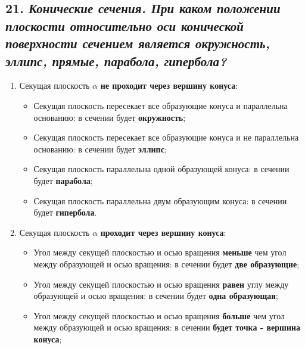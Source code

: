 \newpage
\subsection*{21. \textit{Конические сечения. При каком положении плоскости относительно оси конической поверхности сечением является окружность, эллипс, прямые, парабола, гипербола?}}

\begin{mainQuote}
\end{mainQuote}

\begin{enumerate}
    \item Секущая плоскость $\alpha$ {\bf не проходит через вершину конуса}:
    \begin{itemize}
        \item Секущая плоскость пересекает все образующие конуса и параллельна основанию: в сечении будет {\bf окружность};
        \item Секущая плоскость пересекает все образующие конуса и не параллельна основанию: в сечении будет {\bf эллипс};
        \item Секущая плоскость параллельна одной образующей конуса: в сечении будет {\bf парабола};
        \item Секущая плоскость параллельна двум образующим конуса: в сечении будет {\bf гипербола}.
    \end{itemize}
    \item Секущая плоскость $\alpha$ {\bf проходит через вершину конуса}:
    \begin{itemize}
        \item Угол между секущей плоскостью и осью вращения {\bf меньше} чем угол между образующей и осью вращения: в сечении будет {\bf две образующие};
        \item Угол между секущей плоскостью и осью вращения {\bf равен} углу между образующей и осью вращения: в сечении будет {\bf одна образующая};
        \item Угол между секущей плоскостью и осью вращения {\bf больше} чем угол между образующей и осью вращения: в сечении {\bf будет точка - вершина конуса};

    \end{itemize}
\end{enumerate}


